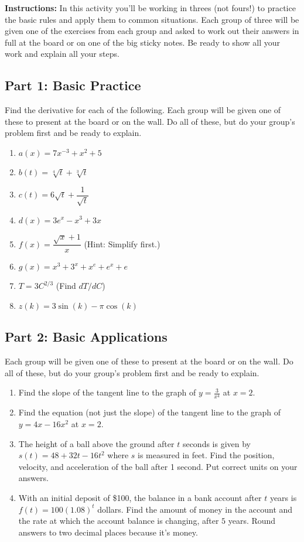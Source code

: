 \documentclass[11pt]{article}
\begin{document}
\noindent
\textbf{Instructions:} In this activity you'll be working in threes (not fours!) to practice the basic rules and apply them to common situations. Each group of three will be given one of the exercises from each group and asked to work out their answers in full at the board or on one of the big sticky notes. Be ready to show all your work and explain all your steps. 

\bigskip

\subsection*{Part 1: Basic Practice}

Find the derivative for each of the following. Each group will be given one of these to present at the board or on the wall. Do all of these, but do your group's problem first and be ready to explain. 


\begin{enumerate}
    \item $a(x) = 7x^{-3} + x^2 + 5$
    \item $b(t) = \sqrt[4]{t} + \sqrt[3]{t}$
    \item $c(t) = 6 \sqrt{t} + \dfrac{1}{\sqrt{t}}$
    \item $d(x) = 3e^x - x^3 + 3x$
    \item $f(x) = \dfrac{\sqrt{x} + 1}{x}$ (Hint: Simplify first.) 
    \item $g(x) = x^3 + 3^x + x^e + e^x + e$
    \item $T = 3C^{2/3}$ (Find $dT/dC$) 
    \item $z(k) = 3 \sin(k) - \pi \cos(k)$
    
\end{enumerate}

\subsection*{Part 2: Basic Applications}

Each group will be given one of these to present at the board or on the wall. Do all of these, but do your group's problem first and be ready to explain.

\begin{enumerate}
    \item Find the slope of the tangent line to the graph of $y = \frac{3}{x^4}$ at $x=2$. 
    \item Find the equation (not just the slope) of the tangent line to the graph of $y = 4x - 16x^2$ at $x = 2$. 
    \item The height of a ball above the ground after $t$ seconds is given by $s(t) = 48 + 32 t - 16 t^2$ where $s$ is measured in feet. Find the position, velocity, and acceleration of the ball after 1 second. Put correct units on your answers. 
    \item With an initial deposit of \$100, the balance in a bank account after $t$ years is $f(t) = 100(1.08)^t$ dollars. Find the amount of money in the account and the rate at which the account balance is changing, after $5$ years. Round answers to two decimal places because it's money. 
\end{enumerate}
\end{document}
